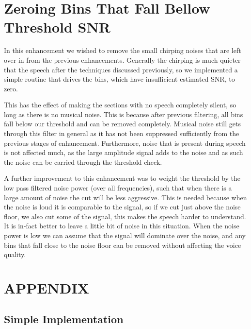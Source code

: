 \documentclass[11pt]{article} %
\begin{document}
\section{Zeroing Bins That Fall Bellow Threshold SNR} 

In this enhancement we wished to remove the small chirping noises that are left over in from the previous enhancements. Generally the chirping is much quieter that the speech after the techniques discussed previously, so we implemented a simple routine that drives the bins, which have insufficient estimated SNR, to zero.

This has the effect of making the sections with no speech completely silent, so long as there is no musical noise. This is because after previous filtering, all bins fall below our threshold and can be removed completely. Musical noise still gets through this filter in general as it has not been suppressed sufficiently from the previous stages of enhancement. Furthermore, noise that is present during speech is not affected much, as the large amplitude signal adds to the noise and as such the noise can be carried through the threshold check. 

A further improvement to this enhancement was to weight the threshold by the low pass filtered noise power (over all frequencies), such that when there is a large amount of noise the cut will be less aggressive. This is needed because when the noise is loud it is comparable to the signal, so if we cut just above the noise floor, we also cut some of the signal, this makes the speech harder to understand. It is in-fact better to leave a little bit of noise in this situation. When the noise power is low we can assume that the signal will dominate over the noise, and any bins that fall close to the noise floor can be removed without affecting the voice quality.  


\clearpage

\section{APPENDIX}
\renewcommand{\thesubsection}{\Alph{subsection}}
\subsection{Simple Implementation} 
\label{app:simple}
\end{document}
